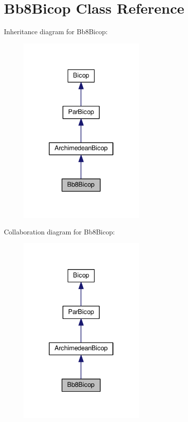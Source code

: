\hypertarget{class_bb8_bicop}{}\section{Bb8\+Bicop Class Reference}
\label{class_bb8_bicop}


Inheritance diagram for Bb8\+Bicop\+:\nopagebreak
\begin{figure}[H]
\begin{center}
\leavevmode
\includegraphics[width=178pt]{class_bb8_bicop__inherit__graph}
\end{center}
\end{figure}


Collaboration diagram for Bb8\+Bicop\+:\nopagebreak
\begin{figure}[H]
\begin{center}
\leavevmode
\includegraphics[width=178pt]{class_bb8_bicop__coll__graph}
\end{center}
\end{figure}
